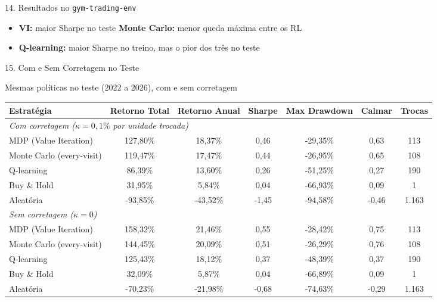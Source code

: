 \documentclass[aspectratio=169,10pt,t]{beamer}
\begin{document}
\begin{frame}{14. Resultados no \texttt{gym-trading-env}}
  \small
  \begin{itemize}\setlength{\itemsep}{2pt}
    \item \textbf{VI:} maior Sharpe no teste \quad \textbf{Monte Carlo:} menor queda máxima entre os RL
    \item \textbf{Q-learning:} maior Sharpe no treino, mas o pior dos três no teste
  \end{itemize}

\end{frame}

\begin{frame}{15. Com e Sem Corretagem no Teste}

  \begin{block}{Mesmas políticas no teste (2022 a 2026), com e sem corretagem}
    \centering\scriptsize
    \setlength{\tabcolsep}{5pt}
    \renewcommand{\arraystretch}{1.0}
    \begin{tabular}{l cccccc}
      \toprule
      \textbf{Estratégia} & \textbf{Retorno Total} & \textbf{Retorno Anual} & \textbf{Sharpe} & \textbf{Max Drawdown} & \textbf{Calmar} & \textbf{Trocas} \\
      \midrule
      \multicolumn{7}{l}{\textit{Com corretagem ($\kappa = 0{,}1\%$ por unidade trocada)}} \\
      MDP (Value Iteration)      & 127,80\%  & 18,37\%  & 0,46  & -29,35\%  & 0,63  & 113 \\
      Monte Carlo (every-visit)  & 119,47\%  & 17,47\%  & 0,44  & -26,95\%  & 0,65  & 108 \\
      Q-learning                 & 86,39\%   & 13,60\%  & 0,26  & -51,25\%  & 0,27  & 190 \\
      Buy \& Hold                & 31,95\%   & 5,84\%   & 0,04  & -66,93\%  & 0,09  & 1 \\
      Aleatória                  & -93,85\%  & -43,52\% & -1,45 & -94,58\%  & -0,46 & 1.163 \\
      \midrule
      \multicolumn{7}{l}{\textit{Sem corretagem ($\kappa = 0$)}} \\
      MDP (Value Iteration)      & 158,32\%  & 21,46\%  & 0,55  & -28,42\%  & 0,75  & 113 \\
      Monte Carlo (every-visit)  & 144,45\%  & 20,09\%  & 0,51  & -26,29\%  & 0,76  & 108 \\
      Q-learning                 & 125,43\%  & 18,12\%  & 0,37  & -48,39\%  & 0,37  & 190 \\
      Buy \& Hold                & 32,09\%   & 5,87\%   & 0,04  & -66,89\%  & 0,09  & 1 \\
      Aleatória                  & -70,23\%  & -21,98\% & -0,68 & -74,63\%  & -0,29 & 1.163 \\
      \bottomrule
    \end{tabular}
  \end{block}


\end{frame}
\end{document}

